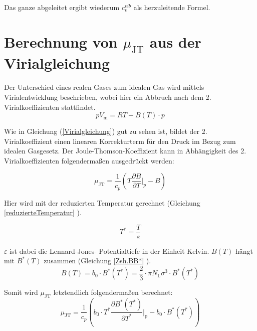 \documentclass[a4paper,12pt,oneside,onecolum,final,openany]{report}
\begin{document}
Das ganze abgeleitet ergibt wiederum $c_v^{vib}$ als herzuleitende Formel.\\


\section{Berechnung von $\mu_\mathrm{JT}$ aus der Virialgleichung}

Der Unterschied eines realen Gases zum idealen Gas wird mittels Virialentwicklung beschrieben, wobei hier ein Abbruch nach dem 2. Virialkoeffizienten stattfindet.\\

\begin{equation}
pV_\mathrm{m} = RT + B(T) \cdot p \label{Virialgleichung}
\end{equation}

Wie in Gleichung (\ref{Virialgleichung}) gut zu sehen ist, bildet der 2. Virialkoeffizient einen linearen Korrekturterm für den Druck im Bezug zum idealen Gasgesetz.
Der Joule-Thomson-Koeffizient kann in Abhängigkeit des 2. Virialkoeffizienten folgendermaßen ausgedrückt werden:

\begin{equation}
\mu_\mathrm{JT} = \frac{1}{c_p}\left( T \frac{\partial B}{\partial T} \bigg \vert_p - B\right)
\end{equation}

Hier wird mit der reduzierten Temperatur gerechnet (Gleichung \ref{reduzierteTemperatur} ). 

\begin{equation}
T^* = \frac{T}{\varepsilon} \label{reduzierteTemperatur}
\end{equation}

$\varepsilon$ ist dabei die Lennard-Jones- Potentialtiefe in der Einheit Kelvin. $B(T)$ hängt mit $B^*(T)$ zusammen (Gleichung \ref{Zsh.BB*} ).\\

\begin{equation}
B(T) = b_0 \cdot B^*(T^*) = \frac{2}{3} \cdot \pi N_\mathrm{L} \sigma^3 \cdot B^*(T^*) \label{Zsh.BB*}
\end{equation}

Somit wird $\mu_\mathrm{JT}$ letztendlich folgendermaßen berechnet:\\

\begin{equation} \label{EndgleichungJT}
\mu_\mathrm{JT} = \frac{1}{c_p}\left(b_0 \cdot T^* \frac{\partial B^*(T^*)}{\partial T^*} \bigg \vert_\mathrm{p} - b_0 \cdot B^*(T^*)\right)
\end{equation}
\end{document}
